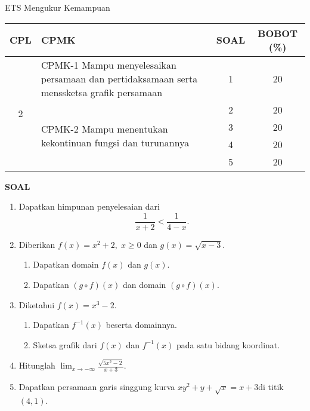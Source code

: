 \documentclass[10pt,openany,a4paper]{article}
\begin{document}
\begin{table}[h]
    \centering
    ETS Mengukur Kemampuan
    \begin{tabular}{|c|m{10.5cm}|c|c|}
        \hline
        CPL & CPMK                                                                                      & SOAL & BOBOT (\%) \\ \hline
        \multirow{5}{*}{2}
            & CPMK-1 Mampu menyelesaikan persamaan dan pertidaksamaan serta menssketsa grafik persamaan & 1    & 20         \\ \cline{2-4}
            & \multirow{4}{*}{CPMK-2 Mampu menentukan kekontinuan fungsi dan turunannya}                & 2    & 20         \\\cline{3-4}
            &                                                                                           & 3    & 20         \\ \cline{3-4}
            &                                                                                           & 4    & 20         \\ \cline{3-4}
            &                                                                                           & 5    & 20         \\ \hline
    \end{tabular}
\end{table}
{\centering\textbf{SOAL}}
\begin{enumerate}
    \item Dapatkan himpunan penyelesaian dari
          \[
              \frac{1}{x+2} < \frac{1}{4-x}.
          \]

    \item Diberikan $f(x) = x^2 + 2,\; x \geq 0$ dan $g(x) = \sqrt{x-3}$.
          \begin{enumerate}
              \item Dapatkan domain $f(x)$ dan $g(x)$.
              \item Dapatkan $(g \circ f)(x)$ dan domain $(g \circ f)(x)$.
          \end{enumerate}

    \item Diketahui $f(x) = x^3 - 2$.
          \begin{enumerate}
              \item Dapatkan $f^{-1}(x)$ beserta domainnya.
              \item Sketsa grafik dari $f(x)$ dan $f^{-1}(x)$ pada satu bidang koordinat.
          \end{enumerate}

    \item Hitunglah $\displaystyle\lim_{x \to -\infty} \frac{\sqrt{5x^2 - 2}}{x+3}$.

    \item Dapatkan persamaan garis singgung kurva $xy^2 + y + \sqrt{x} = x + 3$di titik $(4,1)$.
\end{enumerate}
\end{document}
